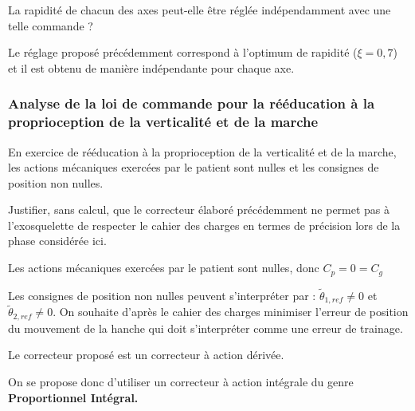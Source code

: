 \begin{question}
\label{2023_ccs_psi_q_29}
La rapidité de chacun des axes peut-elle être réglée indépendamment avec une telle commande ?
\end{question}
\ifprof
\begin{corrige}
Le réglage proposé précédemment correspond à l'optimum de rapidité ($\xi=0,7$) et il est obtenu de manière indépendante pour chaque axe.
\end{corrige}
\else
\fi

\subsubsection{Analyse de la loi de commande pour la rééducation à la proprioception de la verticalité et de la marche}

En exercice de rééducation à la proprioception de la verticalité et de la marche, les actions mécaniques exercées par le patient sont nulles et les consignes de position non nulles.\\

\begin{question}
\label{2023_ccs_psi_q_30}
Justifier, sans calcul, que le correcteur élaboré précédemment ne permet pas à l'exosquelette de respecter le cahier des charges en termes de précision lors de la phase considérée ici.
\end{question}
\ifprof
\begin{corrige}
Les actions mécaniques exercées par le patient sont nulles, donc $C_p=0=C_g$

Les consignes de position non nulles peuvent s'interpréter par : $\tilde{\theta}_{1,ref}\neq 0$ et $\tilde{\theta}_{2,ref}\neq 0$.
On souhaite d'après le cahier des charges minimiser l'erreur de position du mouvement de la hanche qui doit s'interpréter comme une erreur de trainage.

Le correcteur proposé est un correcteur à action dérivée.

On se propose donc d'utiliser un correcteur à action intégrale du genre \textbf{Proportionnel Intégral.}

\end{corrige}
\else
\fi

